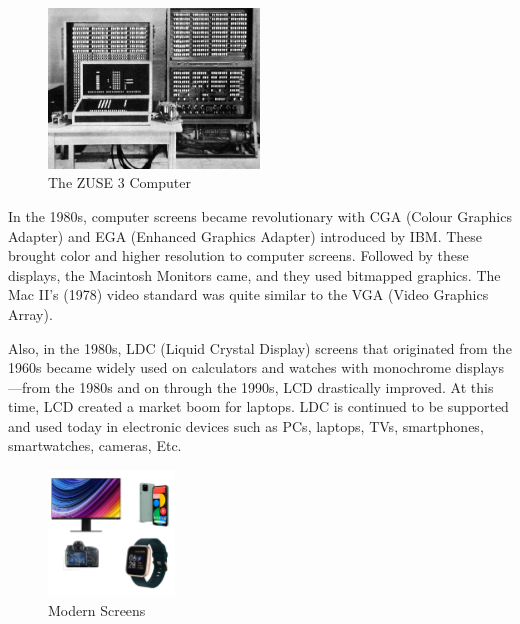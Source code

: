 \documentclass{article}
\begin{document}
\begin{figure}[!h]
    \caption{The ZUSE 3 Computer}
    \label{image:ZUSE3}
    \centering
    \includegraphics[width=0.5\textwidth]{pics/z3.jpg}
\end{figure}

In the 1980s, computer screens became revolutionary with CGA (Colour Graphics Adapter) and EGA (Enhanced Graphics Adapter) introduced by IBM. These brought color and higher resolution to computer screens. Followed by these displays, the Macintosh Monitors came, and they used bitmapped graphics. The Mac II’s (1978) video standard was quite similar to the VGA (Video Graphics Array). 

Also, in the 1980s, LDC (Liquid Crystal Display) screens that originated from the 1960s became widely used on calculators and watches with monochrome displays—from the 1980s and on through the 1990s, LCD drastically improved. At this time, LCD created a market boom for laptops. LDC is continued to be supported and used today in electronic devices such as PCs, laptops, TVs, smartphones, smartwatches, cameras, Etc.
\cite{ref5}

\begin{figure}[!h]
    \caption{Modern Screens}
    \label{image:MODERNSCREENS}
    \centering
    \includegraphics[width=0.3\textwidth]{pics/modern_screens.png}
\end{figure}
\end{document}
